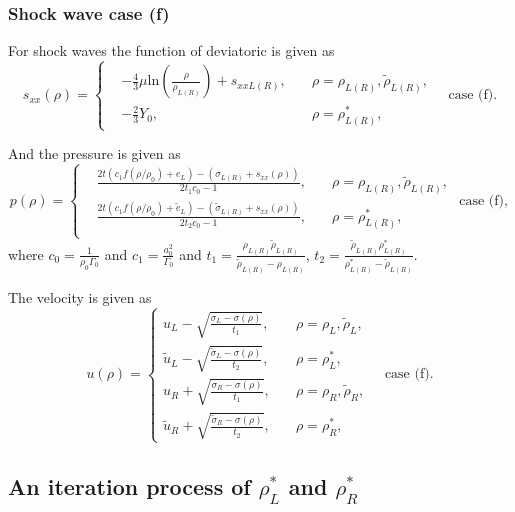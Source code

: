 \documentclass[review]{elsarticle}
\begin{document}
\subsubsection{Shock wave case (f)}
For shock waves the function of deviatoric is given as 
\begin{equation}
  s_{xx}(\rho) = \left\{\begin{aligned}
	  & -\frac{4}{3}\mu\text{ln}\left(\frac{\rho}{\rho_{L(R)}}\right)+s_{xxL(R)},\quad &  \rho =\rho_{L(R)},\tilde{\rho}_{L(R)},\\
	  & -\frac{2}{3}Y_0, \quad  & \rho = \rho_{L(R)}^*,
  \end{aligned} \right. \quad  \text{case (f)}.
  \end{equation}

And the pressure is given as
\begin{equation}
  p(\rho)= \left\{\begin{aligned} 
	  & \frac{2t(c_1f(\rho/\rho_0)+e_L)-(\sigma_{L(R)}+s_{xx}(\rho))}{2t_1c_0-1}, \quad  &  \rho=\rho_{L(R)},\tilde{\rho}_{L(R)},\\ 
	  & \frac{2t(c_1f(\rho/\rho_0)+\tilde{e}_L)-(\tilde{\sigma}_{L(R)}+s_{xx}(\rho))}{2t_2c_0-1}, \quad  &  \rho=\rho_{L(R)}^*,\\ 
  \end{aligned}\right.
  \text{ case (f)},
\end{equation}
where $c_0 = \frac{1}{\rho_0\Gamma_0}$ and $c_1 = \frac{a_0^2}{\Gamma_0}$ and $ t_1=\frac{\rho_{L(R)} \tilde{\rho}_{L(R)}}{\tilde{\rho}_{L(R)}-\rho_{L(R)}}$, $ t_2=\frac{\tilde{\rho}_{L(R)} \rho_{L(R)}^*}{\rho_{L(R)}^*-\tilde{\rho}_{L(R)}}$.

The velocity is given as
\begin{equation}
  u(\rho) = \left\{ \begin{array}{ll}
	  u_L -\sqrt{\frac{\sigma_L-\sigma(\rho)}{t_1}}, \quad &\rho = \rho_L,\tilde{\rho}_L,\\ 
	  \tilde{u}_L -\sqrt{\frac{\tilde{\sigma}_L-\sigma(\rho)}{t_2}}, \quad &\rho = \rho_L^*,\\ 
	  u_R +\sqrt{\frac{\sigma_R-\sigma(\rho)}{t_1}}, \quad &\rho = \rho_R, \tilde{\rho}_R, \\ 
	\tilde{u}_R +\sqrt{\frac{\tilde{\sigma}_R-\sigma(\rho)}{t_2}}, \quad &\rho = \rho_R^*, \end{array}
  \right. \quad \text{case (f)}.
\end{equation}



  \subsection{An iteration process of $\rho^*_L$ and $\rho^*_R$}\label{sec:iteration}
\end{document}
